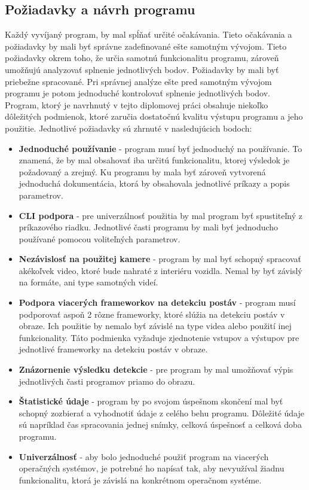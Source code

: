 \documentclass[slovak,master,dept460,male,cpp,cpdeclaration]{diploma}
\begin{document}
\newpage
\subsection{Požiadavky a návrh programu}
Každý vyvíjaný program, by mal  spĺňať určité očakávania. Tieto očakávania a požiadavky by mali byť správne zadefinované ešte samotným vývojom. Tieto požiadavky okrem toho, že určia samotnú funkcionalitu programu, zároveň umožňujú analyzovať splnenie jednotlivých bodov. Požiadavky by mali byť priebežne spracované. Pri správnej analýze ešte pred samotným vývojom programu je potom jednoduché kontrolovať splnenie jednotlivých bodov. Program, ktorý je navrhnutý v tejto diplomovej práci obsahuje niekoľko dôležitých podmienok, ktoré zaručia dostatočnú kvalitu výstupu programu a jeho použitie. Jednotlivé požiadavky sú zhrnuté v nasledujúcich bodoch:
\begin{itemize}
\item \textbf{Jednoduché používanie} - program  musí byť jednoduchý na používanie. To znamená, že by mal obsahovať  iba určitú funkcionalitu, ktorej výsledok je požadovaný a zrejmý. Ku programu by mala byť zároveň vytvorená jednoduchá dokumentácia, ktorá by obsahovala jednotlivé príkazy a popis parametrov.

\item \textbf{CLI podpora} - pre univerzálnosť použitia by mal program byť spustiteľný z príkazového riadku. Jednotlivé časti programu by mali byť jednoducho používané pomocou voliteľných parametrov.

\item \textbf{Nezávislosť na použitej kamere} - program by  mal byť schopný spracovať  akékoľvek video, ktoré bude nahraté z interiéru vozidla. Nemal by byť závislý na formáte, ani type samotných videí.

\item \textbf{Podpora  viacerých frameworkov na detekciu postáv} - program musí podporovať aspoň 2 rôzne frameworky, ktoré slúžia na detekciu postáv v obraze. Ich  použitie by nemalo byť závislé na type videa alebo použití inej funkcionality. Táto podmienka vyžaduje zjednotenie vstupov a výstupov pre jednotlivé frameworky na detekciu postáv v obraze.
\item \textbf{Znázornenie výsledku detekcie} - pre program by mal umožňovať výpis jednotlivých časti programov priamo do obrazu.
\item \textbf{Štatistické údaje} - program by po svojom úspešnom skončení mal byť schopný  zozbierať a vyhodnotiť údaje z celého behu programu. Dôležité údaje sú napríklad čas spracovania jednej snímky, celková úspešnosť a celková doba programu. 
\item \textbf{Univerzálnosť} -  aby bolo jednoduché použiť program na viacerých operačných systémov, je potrebné ho napísať tak, aby  nevyužíval žiadnu funkcionalitu, ktorá je závislá na konkrétnom operačnom systéme. 
\end{itemize}
\end{document}
